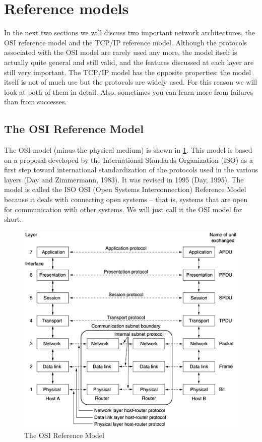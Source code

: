 
\section{Reference models}

In the next two sections we will discuss two important network architectures, the OSI reference model and the TCP/IP reference model.
Although the {protocols} associated with the OSI model are rarely used any more, the {model} itself is actually quite general and still valid, and the features discussed at each layer are still very important.
The TCP/IP model has the opposite properties: the model itself is not of much use but the protocols are widely used.
For this reason we will look at both of them in detail. Also, sometimes you can learn more from failures than from successes.

\subsection{The OSI Reference Model}

The OSI model (minus the physical medium) is shown in \cref{fig:osi-model}.
This model is based on a proposal developed by the International Standards Organization (ISO) as a first step toward international standardization of the protocols used in the various layers (Day and Zimmermann, 1983).
It was revised in 1995 (Day, 1995).
The model is called the ISO OSI (Open Systems Interconnection) Reference Model because it deals with connecting open systems -- that is, systems that are open for communication with other systems.
We will just call it the OSI model for short.


\begin{figure}
   \centering
   \includegraphics[width=\textwidth]{images/01fig20.png}
   \caption{The OSI Reference Model}
   \label{fig:osi-model}
\end{figure}



